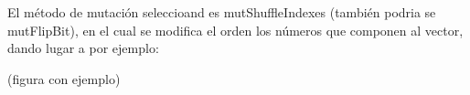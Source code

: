 %
%
%
%
%

El método de mutación seleccioand es mutShuffleIndexes (también podria se
mutFlipBit), en el cual se modifica el orden los números que componen al vector,
dando lugar a por ejemplo:

(figura con ejemplo)
